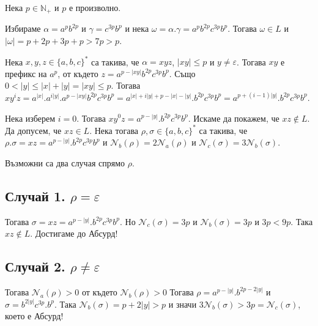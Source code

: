 \documentclass[12pt]{article}
\begin{document}
\vspace*{5mm}

Нека \(p \in \mathbb{N}_+\) и \(p\) е произволно.

\vspace*{5mm}

Избираме \(\alpha = a^pb^{2p}\) и \(\gamma = c^{3p}b^p\) и нека \(\omega = \alpha.\gamma = a^pb^{2p}c^{3p}b^p\).
Тогава \(\omega \in L\) и \(|\omega| = p + 2p + 3p + p> 7p > p\).

\vspace*{5mm}

\par Нека \(x, y, z \in \{a, b, c\}^*\) са такива, че \(\alpha = xyz\), \(|xy| \leq p\) и \(y \neq \varepsilon\).
Тогава \(xy\) е префикс на \(a^p\), от където \(z = a^{p - |xy|}b^{2p}c^{3p}b^p\). Също \\
\(0 < |y| \leq |x| + |y| = |xy| \leq p\). Тогава \(xy^iz = a^{|x|}.a^{i|y|}.a^{p - |xy|}b^{2p}c^{3p}b^p = a^{|x| + i|y| + p - |x| - |y|}.b^{2p}c^{3p}b^p = a^{p + (i - 1)|y|}.b^{2p}c^{3p}b^p\).

\vspace*{3mm}

\par Нека изберем \(i = 0\). Тогава \(xy^0z = a^{p - |y|}.b^{2p}c^{3p}b^p\). Искаме да покажем, че \(xz \notin L\).
Да допусем, че \(xz \in L\).
Нека тогава \(\rho, \sigma \in \{a, b, c\}^*\) са такива, че \(\rho.\sigma = xz = a^{p - |y|}.b^{2p}c^{3p}b^p\)
и \(\mathcal{N}_b(\rho) = 2\mathcal{N}_a(\rho)\) и  \(\mathcal{N}_c(\sigma) = 3\mathcal{N}_b(\sigma)\).

Възможни са два случая спрямо \(\rho\).

\subsection{Случай 1. \(\rho = \varepsilon\)}
Тогава \(\sigma = xz = a^{p - |y|}.b^{2p}c^{3p}b^p\). Но \(\mathcal{N}_c(\sigma) = 3p\) и \(\mathcal{N}_b(\sigma) = 3p\) и \(3p < 9p\). Така \(xz \notin L\). Достигаме до Абсурд!

\subsection{Случай 2. \(\rho \neq \varepsilon\)}
Тогава \(\mathcal{N}_a(\rho) > 0\) от където \(\mathcal{N}_b(\rho) > 0\) Тогава \(\rho = a^{p - |y|}.b^{2p - 2|y|}\) и \(\sigma = b^{2|y|}c^{3p}.b^p\). Така \(\mathcal{N}_b(\sigma) = p + 2|y| > p\) и значи \(3\mathcal{N}_b(\sigma) > 3p = \mathcal{N}_c(\sigma)\), което е Абсурд!
\end{document}
